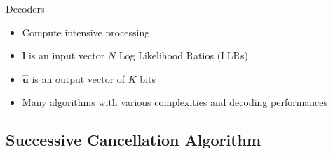 \begin{frame}{Decoders}
  \begin{itemize}
    \item<1-> Compute intensive processing
    \item<2-> $\bm{l}$ is an input vector $N$ Log Likelihood Ratios (LLRs)
    \item<2-> $\bm{\hat{u}}$ is an output vector of $K$ bits
    \item<3-> Many algorithms with various complexities and decoding performances
  \end{itemize}
\end{frame}

\subsection[Successive Cancellation Algorithm]{Successive Cancellation Algorithm}

